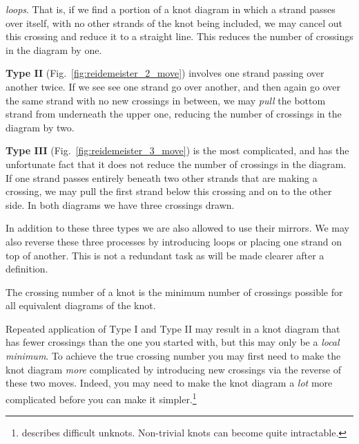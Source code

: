         \textit{loops}. That is, if we find a portion of a knot diagram in which
        a strand passes over itself, with no other strands of the knot being
        included, we may cancel out this crossing and reduce it to a straight
        line. This reduces the number of crossings in the diagram by one.
        \par\hfill\par
        \textbf{Type II} (Fig.~\ref{fig:reidemeister_2_move}) involves one
        strand passing over another twice. If we see see one strand go over
        another, and then again go over the same strand with no new crossings
        in between, we may \textit{pull} the bottom strand from underneath
        the upper one, reducing the number of crossings in the diagram by two.
        \par\hfill\par
        \textbf{Type III} (Fig.~\ref{fig:reidemeister_3_move}) is the most
        complicated, and has the unfortunate fact that it does not reduce the
        number of crossings in the diagram. If one strand passes entirely
        beneath two other strands that are making a crossing, we may pull the
        first strand below this crossing and on to the other side. In both
        diagrams we have three crossings drawn.
        \par\hfill\par
        In addition to these three types we are also allowed to use their
        mirrors. We may also reverse these three processes by
        introducing loops or placing one strand on top of another. This is not
        a redundant task as will be made clearer after a definition.
        \begin{definition}
            The crossing number of a knot is the minimum number of crossings
            possible for all equivalent diagrams of the knot.
        \end{definition}
        Repeated application of Type I and Type II may result in
        a knot diagram that has fewer crossings than the one you started with,
        but this may only be a \textit{local minimum}. To achieve the true
        crossing number you may first need to make the knot diagram
        \textit{more} complicated by introducing new crossings via the reverse
        of these two moves. Indeed, you may need to
        make the knot diagram a \textit{lot} more complicated before you can
        make it simpler.\footnote{%
            \cite{KauffmanHardUnknots} describes difficult unknots. Non-trivial
            knots can become quite intractable.
        }
